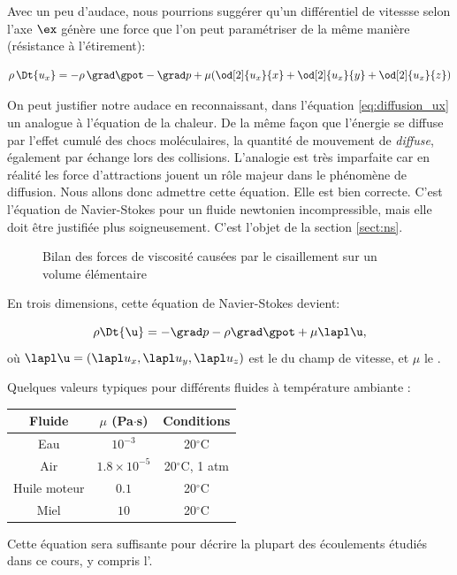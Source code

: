 Avec un peu d'audace, nous pourrions suggérer qu'un différentiel de vitessse selon l'axe $\ex$ génère une force que l'on peut paramétriser de la même manière (résistance à l'étirement):

\begin{equation}
  \rho \, \Dt{u_x} = - \rho \, \grad \gpot - \grad p + \mu ( \od[2]{u_x}{x} + \od[2]{u_x}{y} +  \od[2]{u_x}{z} )
  \label{eq:diffusion_ux}
\end{equation}

On peut justifier notre audace en reconnaissant, dans l'équation \eqref{eq:diffusion_ux} un analogue à l'équation de la chaleur. De la même façon que l'énergie se diffuse par l'effet cumulé des chocs moléculaires, la quantité de mouvement de \emph{diffuse}, également par échange lors des collisions. L'analogie est très imparfaite car en réalité les force d'attractions jouent un rôle majeur dans le phénomène de diffusion. Nous allons donc admettre cette équation. Elle est bien correcte. C'est l'équation de Navier-Stokes pour un fluide newtonien incompressible, mais elle doit être justifiée plus soigneusement. C'est l'objet de la section \ref{sect:ns}. 

\begin{figure}
  \begin{center}
    
  \end{center}
  \caption{Bilan des forces de viscosité causées par le cisaillement sur un volume élémentaire}
\end{figure}


En trois dimensions, cette équation de Navier-Stokes devient: 

\begin{displaymath}
  \rho \Dt{\u} = -\grad p - \rho \grad \gpot + \mu \lapl \u,
\end{displaymath}
où $\lapl \u = (\lapl u_x, \lapl u_y, \lapl u_z)$ est le  du champ de vitesse, et $\mu$ le . 

Quelques valeurs typiques pour différents fluides à température ambiante :

\begin{center}
\begin{tabular}{|c|c|c|}
\hline
Fluide & $\mu$ (Pa$\cdot$s) & Conditions \\
\hline
Eau & $10^{-3}$ & 20$^\circ$C \\
\hline
Air & $1.8 \times 10^{-5}$ & 20$^\circ$C, 1 atm \\
\hline
Huile moteur & $0.1$ & 20$^\circ$C \\
\hline
Miel & $10$ & 20$^\circ$C \\
\hline
\end{tabular}
\end{center}
Cette équation sera suffisante pour décrire la plupart des écoulements étudiés dans ce cours, y compris l'.





